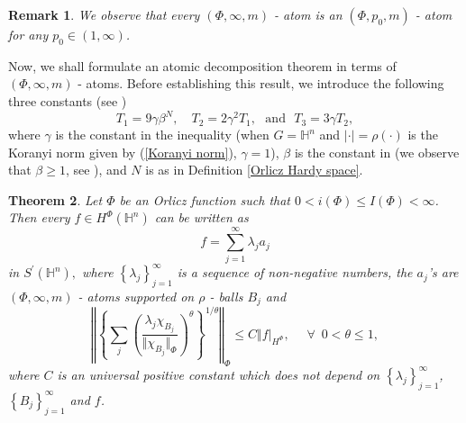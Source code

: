 \documentclass[oneside,10pt]{article}
\newtheorem{theorem}{Theorem}
\newtheorem{remark}[theorem]{Remark}
\begin{document}
\begin{remark} \label{atomo infinito}
We observe that every $(\Phi, \infty, m)$ - atom is an $(\Phi, p_0, m)$ - atom for any $p_0 \in (1, \infty)$.
\end{remark}

Now, we shall formulate an atomic decomposition theorem in terms of $(\Phi, \infty, m)$ - atoms. Before establishing this result, we introduce the following three constants (see \cite[p. 81]{Foll-St})
\[
T_1 = 9 \gamma \beta^{N}, \,\,\,\,\,\, T_2 = 2 \gamma^2 T_1, \,\,\,\, \text{and} \,\,\,\, T_3 = 3 \gamma T_2,
\] 
where $\gamma$ is the constant in the inequality \cite[(1.8)]{Foll-St} (when $G = \mathbb{H}^n$ and $|\cdot|=\rho(\cdot)$ is the Koranyi norm given by (\ref{Koranyi norm}), $\gamma = 1$), $\beta$ is  the constant in \cite[Theorem 1.33]{Foll-St} (we observe that $\beta \geq 1$, see \cite[p. 29]{Foll-St}), and $N$ is as in Definition \ref{Orlicz Hardy space}.


\begin{theorem} \label{infinite atomic decomp}
Let $\Phi$ be an Orlicz function such that $0 < i(\Phi) \leq I(\Phi) < \infty$. Then every $f \in H^{\Phi}(\mathbb{H}^n)$ can be written as
\begin{equation}
f=\sum\limits_{j=1}^{\infty } \lambda_{j}a_{j}  \label{serie atomica}
\end{equation}
in $S^{\prime }(\mathbb{H}^{n}),$ where $\left\{ \lambda_{j} \right\}_{j=1}^{\infty}$ is a sequence of non-negative numbers, the $a_{j}$'s are 
$(\Phi, \infty, m)$ - atoms supported on $\rho$ - balls $B_j$ and
\begin{equation} \label{norma atomica}
\left\Vert \left\{ \sum_{j} \left( \frac{\lambda_j \chi_{B_j}}{\Vert \chi_{B_j} \Vert_{\Phi}} \right)^{\theta} \right\}^{1/\theta} 
\right\Vert_{\Phi} \leq C \Vert f \vert_{H^{\Phi}}, \,\,\,\,\,\,\,\, \forall \,\,\, 0 < \theta \leq 1,
\end{equation}
where $C$ is an universal positive constant which does not depend on $\left\{ \lambda_{j}\right\}_{j=1}^{\infty}$, 
$\left\{ B_{j}\right\}_{j=1}^{\infty}$ and $f$.
\end{theorem}
\end{document}
